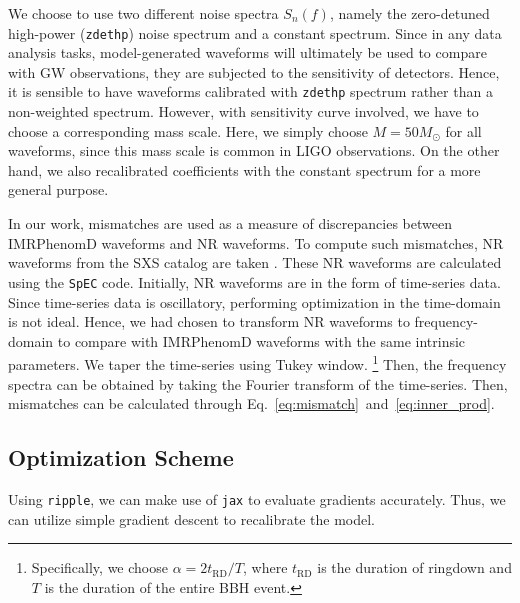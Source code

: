 \documentclass[twocolumn]{aastex631}
\newcommand{\ripple}{\texttt{ripple}}
\newcommand{\jax}{\texttt{jax}}
\newcommand{\zdethp}{\texttt{zdethp}}
\begin{document}
We choose to use two different noise spectra $S_n(f)$, namely the zero-detuned
high-power (\zdethp) noise spectrum and a constant spectrum. Since in any data
analysis tasks, model-generated waveforms will ultimately be used to compare
with GW observations, they are subjected to the sensitivity of detectors. Hence,
it is sensible to have waveforms calibrated with {\zdethp} spectrum rather than
a non-weighted spectrum. However, with sensitivity curve involved, we have to
choose a corresponding mass scale. Here, we simply choose $M=50M_{\odot}$ for
all waveforms, since this mass scale is common in LIGO observations. On the
other hand, we also recalibrated coefficients with the constant spectrum for a
more general purpose. 

In our work, mismatches are used as a measure of discrepancies between
IMRPhenomD waveforms and NR waveforms. To compute such mismatches, NR waveforms
from the SXS catalog are taken \citep{boyle2019sxs}. These NR waveforms are
calculated using the \texttt{SpEC} code. Initially, NR waveforms are in the form
of time-series data. Since time-series data is oscillatory, performing
optimization in the time-domain is not ideal. Hence, we had chosen to transform
NR waveforms to frequency-domain to compare with IMRPhenomD waveforms with the
same intrinsic parameters. We taper the time-series using Tukey window.
\footnote{ Specifically, we choose $\alpha=2t_{\mathrm{RD}}/T$, where
$t_{\mathrm{RD}}$ is the duration of ringdown and $T$ is the duration of the
entire BBH event. } Then, the frequency spectra can be obtained by taking the
Fourier transform of the time-series. Then, mismatches can be calculated through
Eq.~\ref{eq:mismatch}~and~\ref{eq:inner_prod}. 

\subsection{Optimization Scheme} \label{subsec:optimization}

Using \ripple, we can make use of {\jax} to evaluate gradients accurately. Thus,
we can utilize simple gradient descent to recalibrate the model. 


\end{document}
